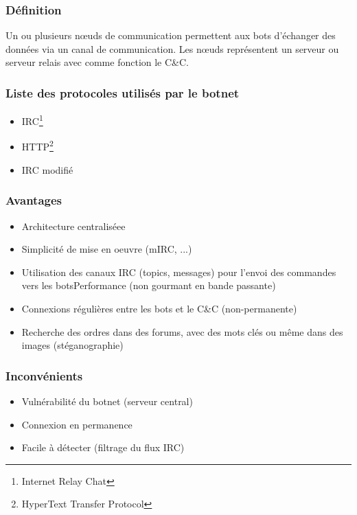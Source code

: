 \subsubsection{Définition}
Un ou plusieurs nœuds de communication permettent aux bots d'échanger des données via un canal de communication.
Les nœuds représentent un serveur ou serveur relais avec comme fonction le C\&C.

\subsubsection{Liste des protocoles utilisés par le botnet}
\begin{itemize}
	\item IRC\footnote{Internet Relay Chat}
	\item HTTP\footnote{HyperText Transfer Protocol}
	\item IRC modifié
\end{itemize}

\subsubsection{Avantages}
\begin{itemize}
	\item Architecture  centraliséee
	\item Simplicité de mise en oeuvre (mIRC, ...)
	\item Utilisation des canaux IRC (topics, messages) pour l’envoi des commandes vers les botsPerformance (non gourmant en bande passante)
	\item Connexions régulières entre les bots et le C\&C (non-permanente)
	\item Recherche des ordres dans des forums, avec des mots clés ou même dans des images (stéganographie)
\end{itemize}

\subsubsection{Inconvénients}
\begin{itemize}
	\item Vulnérabilité du botnet (serveur central)
	\item Connexion en permanence
	\item Facile à détecter (filtrage du flux IRC)
\end{itemize}



